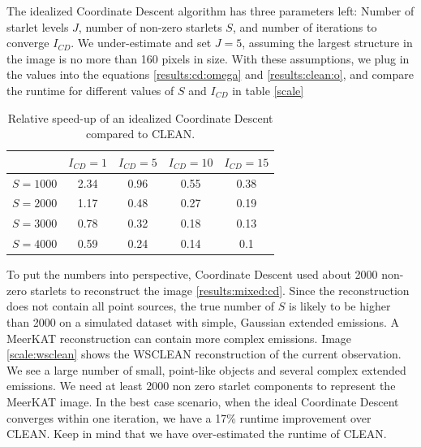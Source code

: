 The idealized Coordinate Descent algorithm has three parameters left: Number of starlet levels $J$, number of non-zero starlets $S$, and number of iterations to converge $I_{CD}$. We under-estimate and set $J=5$, assuming the largest structure in the image is no more than 160 pixels in size. With these assumptions, we plug in the values into the equations \eqref{results:cd:omega} and \eqref{results:clean:o}, and compare the runtime for different values of $S$ and $I_{CD}$ in table \ref{scale}

\begin{table}[h!]
	\begin{center}
		\begin{tabular}{l|c|c|c|c} %
			 & $I_{CD} = 1$ & $I_{CD} = 5$ &  $I_{CD} = 10$ &  $I_{CD} = 15$\\
			\hline
			$S=1000$ & 2.34 & 0.96 & 0.55 & 0.38 \\
			$S=2000$ & 1.17 & 0.48 & 0.27 & 0.19\\
			$S=3000$ & 0.78 & 0.32 & 0.18 & 0.13\\
			$S=4000$ & 0.59 & 0.24 & 0.14 & 0.1\\
		\end{tabular}
		\caption{Relative speed-up of an idealized Coordinate Descent compared to CLEAN.}
		\label{scale:cd:table}
	\end{center}
\end{table}

To put the numbers into perspective, Coordinate Descent used about 2000 non-zero starlets to reconstruct the image \ref{results:mixed:cd}. Since the reconstruction does not contain all point sources, the true number of $S$ is likely to be higher than 2000 on a simulated dataset with simple, Gaussian extended emissions. A MeerKAT reconstruction can contain more complex emissions. Image \ref{scale:wsclean} shows the WSCLEAN reconstruction of the current observation. We see a large number of small, point-like objects and several complex extended emissions. We need at least 2000 non zero starlet components to represent the MeerKAT image. In the best case scenario, when the ideal Coordinate Descent converges within one iteration, we have a 17\% runtime improvement over CLEAN. Keep in mind that we have over-estimated the runtime of CLEAN.

